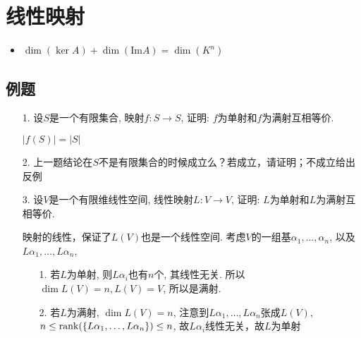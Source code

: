 \section{线性映射}
\begin{itemize}
\item $\dim(\ker A) + \dim(\mathrm{Im} A) = \dim(K^n)$
\end{itemize}

\subsection*{例题}
\begin{itemize}
	\item[1.] 设$S$是一个有限集合, 映射$f:S \rightarrow S$,
	证明: $f$为单射和$f$为满射互相等价.
	\begin{solution}
		$|f(S)| = |S|$
	\end{solution}
	\vspace{1cm}

	\item[2.] 上一题结论在$S$不是有限集合的时候成立么？若成立，请证明；不成立给出反例
	\vspace{1cm}

	\item[3.] 设$V$是一个有限维线性空间, 线性映射$L:V \rightarrow V$,
	证明: $L$为单射和$L$为满射互相等价.
	\begin{solution}
		映射的线性，保证了$L(V)$也是一个线性空间.
		考虑$V$的一组基$\alpha_1,\dots,\alpha_n$, 以及$L\alpha_1, \dots, L\alpha_n$,
		\begin{enumerate}
		\item [1.] 若$L$为单射, 则$L\alpha_i$也有$n$个, 其线性无关. 所以$\dim L(V) = n, L(V) = V$, 所以是满射. 
		\item [2.] 若$L$为满射, $\dim L(V) = n$, 注意到$L\alpha_1, \dots, L\alpha_n$张成$L(V)$,
		$n \le \mathrm{rank}(\{ L\alpha_1,\dots,L\alpha_n\}) \le n$, 
		故$L\alpha_i$线性无关，故$L$为单射
		\end{enumerate}
	\end{solution}
	\vspace{2cm}

\end{itemize}